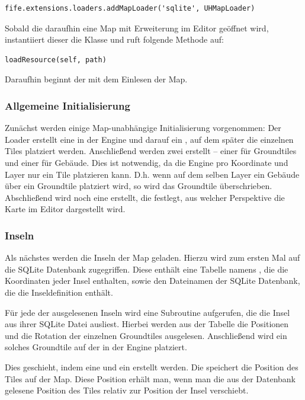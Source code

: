 \begin{lstlisting}
fife.extensions.loaders.addMapLoader('sqlite', UHMapLoader)
\end{lstlisting}

Sobald die daraufhin eine Map mit  Erweiterung im Editor geöffnet
wird, instantiiert dieser die  Klasse und ruft folgende Methode
auf:

\begin{lstlisting}
loadResource(self, path)
\end{lstlisting}

Daraufhin beginnt der  mit dem Einlesen der Map.

\subsubsection{Allgemeine Initialisierung}
Zunächst werden einige Map-unabhängige Initialisierung vorgenommen:
Der Loader erstellt eine  in der Engine und darauf ein
, auf dem später die einzelnen Tiles platziert werden.
Anschließend werden zwei  erstellt -- einer für Groundtiles
und einer für Gebäude. Dies ist notwendig, da die Engine pro Koordinate
und Layer nur ein Tile platzieren kann. D.h. wenn auf dem selben Layer
ein Gebäude über ein Groundtile platziert wird, so wird das Groundtile
überschrieben.
Abschließend wird noch eine  erstellt, die festlegt, aus
welcher Perspektive die Karte im Editor dargestellt wird.

\subsubsection{Inseln}
Als nächstes werden die Inseln der Map geladen. Hierzu wird zum ersten
Mal auf die SQLite Datenbank zugegriffen. Diese enthält eine Tabelle
namens , die die Koordinaten jeder Insel enthalten, sowie
den Dateinamen der SQLite Datenbank, die die Inseldefinition enthält.

Für jede der ausgelesenen Inseln wird eine Subroutine aufgerufen, die
die Insel aus ihrer SQLite Datei ausliest. Hierbei werden aus der
 Tabelle die Positionen und die Rotation der einzelnen
Groundtiles ausgelesen. Anschließend wird ein solches Groundtile
auf der  in der Engine platziert.

Dies geschieht, indem eine  und ein 
erstellt werden. Die  speichert die Position des Tiles
auf der Map. Diese Position erhält man, wenn man die aus der Datenbank
gelesene Position des Tiles relativ zur Position der Insel verschiebt.


